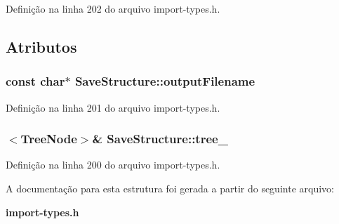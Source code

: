 Definição na linha 202 do arquivo import-\/types.\+h.



\subsection{Atributos}
\subsubsection[{output\+Filename}]{\setlength{\rightskip}{0pt plus 5cm}const char$\ast$ Save\+Structure\+::output\+Filename}\label{struct_save_structure_a9151721b13c96d8f438d3dcb5b2bcdf8}


Definição na linha 201 do arquivo import-\/types.\+h.

\subsubsection[{tree\+\_\+}]{$<${\bf Tree\+Node}$>$\& Save\+Structure\+::tree\+\_\+}\label{struct_save_structure_ac836b112bd4fdbec016686edb48bfd26}


Definição na linha 200 do arquivo import-\/types.\+h.



A documentação para esta estrutura foi gerada a partir do seguinte arquivo\+:\begin{DoxyCompactItemize}
\item 
{\bf import-\/types.\+h}\end{DoxyCompactItemize}

